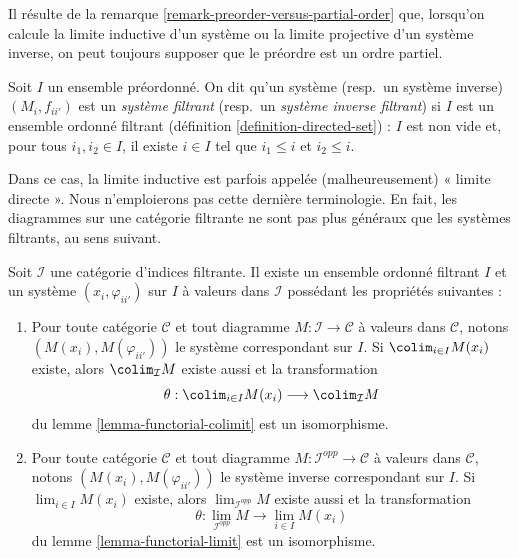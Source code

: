 \noindent
Il résulte de la remarque \ref{remark-preorder-versus-partial-order} que,
lorsqu'on calcule la limite inductive d'un système ou la limite projective
d'un système inverse, on peut toujours supposer que le préordre est un ordre
partiel.

\begin{definition}
\label{definition-directed-system}
Soit $I$ un ensemble préordonné. On dit qu'un système (resp.\ un système
inverse) $(M_i, f_{ii'})$ est un {\it système filtrant} (resp.\ un
{\it système inverse filtrant}) si $I$ est un ensemble ordonné filtrant
(définition \ref{definition-directed-set}) : $I$ est non vide et, pour tous
$i_1, i_2 \in I$, il existe $i\in I$ tel que
$i_1 \leq i$ et $i_2 \leq i$.
\end{definition}

\noindent
Dans ce cas, la limite inductive est parfois appelée (malheureusement)
« limite directe ». Nous n'emploierons pas cette dernière terminologie.
En fait, les diagrammes sur une catégorie filtrante ne sont pas plus
généraux que les systèmes filtrants, au sens suivant.

\begin{lemma}
\label{lemma-directed-category-system}
Soit $\mathcal{I}$ une catégorie d'indices filtrante. Il existe un ensemble
ordonné filtrant $I$ et un système $(x_i, \varphi_{ii'})$ sur $I$ à valeurs dans
$\mathcal{I}$ possédant les propriétés suivantes :
\begin{enumerate}
\item Pour toute catégorie $\mathcal{C}$ et tout diagramme
$M : \mathcal{I} \to \mathcal{C}$ à valeurs dans $\mathcal{C}$, notons
$(M(x_i), M(\varphi_{ii'}))$ le système correspondant sur $I$. Si
$\colim_{i \in I} M(x_i)$ existe, alors $\colim_\mathcal{I} M$ existe aussi
et la transformation
$$
\theta :
\colim_{i \in I} M(x_i)
\longrightarrow
\colim_\mathcal{I} M
$$
du lemme \ref{lemma-functorial-colimit} est un isomorphisme.
\item Pour toute catégorie $\mathcal{C}$ et tout diagramme
$M : \mathcal{I}^{opp} \to \mathcal{C}$ à valeurs dans $\mathcal{C}$, notons
$(M(x_i), M(\varphi_{ii'}))$ le système inverse correspondant sur $I$.
Si $\lim_{i \in I} M(x_i)$ existe, alors $\lim_{\mathcal{I}^{opp}} M$
existe aussi et la transformation
$$
\theta :
\lim_{\mathcal{I}^{opp}} M
\longrightarrow
\lim_{i \in I} M(x_i)
$$
du lemme \ref{lemma-functorial-limit} est un isomorphisme.
\end{enumerate}
\end{lemma}

